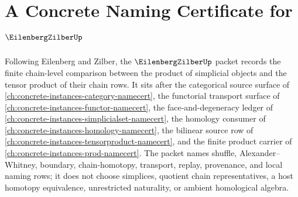 \chapter{A Concrete Naming Certificate for $\EilenbergZilberUp$}
\label{ch:concrete-instances-eilenberg-zilber-namecert}

Following Eilenberg and Zilber, the $\EilenbergZilberUp$ packet records the finite chain-level comparison between the product of simplicial objects and the tensor product of their chain rows. It sits after the categorical source surface of \autoref{ch:concrete-instances-category-namecert}, the functorial transport surface of \autoref{ch:concrete-instances-functor-namecert}, the face-and-degeneracy ledger of \autoref{ch:concrete-instances-simplicialset-namecert}, the homology consumer of \autoref{ch:concrete-instances-homology-namecert}, the bilinear source row of \autoref{ch:concrete-instances-tensorproduct-namecert}, and the finite product carrier of \autoref{ch:concrete-instances-prod-namecert}. The packet names shuffle, Alexander--Whitney, boundary, chain-homotopy, transport, replay, provenance, and local naming rows; it does not choose simplices, quotient chain representatives, a host homotopy equivalence, unrestricted naturality, or ambient homological algebra.


